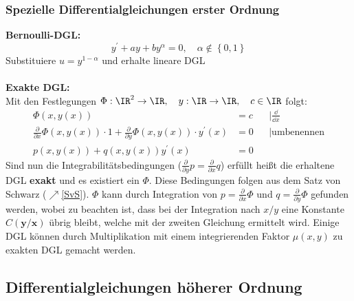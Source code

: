 \subsubsection{Spezielle Differentialgleichungen erster Ordnung}
\textbf{Bernoulli-DGL:}
\begin{equation}
	y^\prime+ay+by^\alpha=0, \quad\alpha\notin\left\{0,1\right\}
\end{equation}
Substituiere $u=y^{1-\alpha}$ und erhalte lineare DGL\\\\
\textbf{Exakte DGL:}\\
Mit den Festlegungen
$\Phi:\IR^2\rightarrow\IR,\quad y: \IR\rightarrow\IR,\quad c\in\IR$ folgt:
\begin{align}
	\Phi(x,y(x))&=c &&|\frac{\dd}{\dd x}\\
	\frac{\partial}{\partial x}\Phi(x,y(x))\cdot 1+\frac{\partial}{\partial y}\Phi(x,y(x))\cdot y^\prime(x)&=0&&|\text{umbenennen}\\
	p(x,y(x))+q(x,y(x))y^\prime(x)&=0
\end{align}
Sind nun die Integrabilitätsbedingungen ($	\frac{\partial}{\partial y}p=	\frac{\partial}{\partial x}q$) erfüllt heißt die erhaltene DGL \textbf{exakt} und es existiert ein $\Phi$. Diese Bedingungen folgen aus dem Satz von Schwarz ($\nearrow$\ref{SvS}). $\Phi$ kann durch Integration von $p=\frac{\partial}{\partial x}\Phi$ und $q=\frac{\partial}{\partial y}\Phi$ gefunden werden, wobei zu beachten ist, dass bei der Integration nach $x/y$ eine Konstante $C\bm{(y/x)}$ übrig bleibt, welche mit der zweiten Gleichung ermittelt wird. Einige DGL können durch Multiplikation mit einem integrierenden Faktor $\mu (x,y)$ zu exakten DGL gemacht werden.
\subsection{Differentialgleichungen höherer Ordnung}
